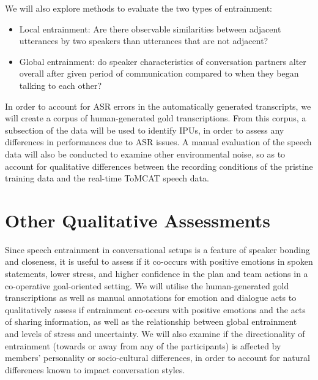     We will also explore methods to evaluate the two types of entrainment:

    \begin{itemize}
        \item Local entrainment: Are there observable similarities between adjacent utterances by two speakers than utterances that are not adjacent?
        \item Global entrainment: do speaker characteristics of conversation partners alter overall after given period of communication compared to when they began talking to each other?
    \end{itemize}

    In order to account for ASR errors in the automatically generated transcripts, we will create a corpus of human-generated gold transcriptions. From this corpus, a subsection of the data will be used to identify IPUs, in order to assess any differences in performances due to ASR issues. A manual evaluation of the speech data will also be conducted to examine other environmental noise, so as to account for qualitative differences between the recording conditions of the pristine training data and the real-time ToMCAT speech data. 

   \section{Other Qualitative Assessments}

   Since speech entrainment in conversational setups is a feature of speaker bonding and closeness, it is useful to assess if it co-occurs with positive emotions in spoken statements, lower stress, and higher confidence in the plan and team actions in a co-operative goal-oriented setting. We will utilise the human-generated gold transcriptions as well as manual annotations for emotion and dialogue acts to qualitatively assess if entrainment co-occurs with positive emotions and the acts of sharing information, as well as the relationship between global entrainment and levels of stress and uncertainty. We will also examine if the directionality of entrainment (towards or away from any of the participants) is affected by members' personality or socio-cultural differences, in order to account for natural differences known to impact conversation styles.

